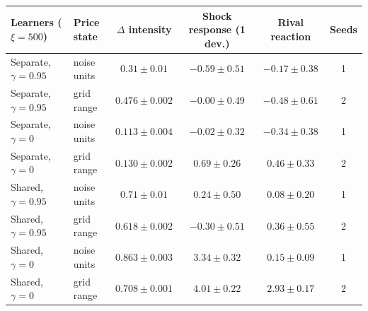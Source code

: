 \begin{tabular}{llcccc}
\toprule
Learners ($\xi=500$) & Price state & $\Delta$ intensity & Shock response (1 dev.) & Rival reaction & Seeds \\
\midrule
Separate, $\gamma=0.95$ & noise units & $0.31 \pm 0.01$ & $-0.59 \pm 0.51$ & $-0.17 \pm 0.38$ & 1 \\
Separate, $\gamma=0.95$ & grid range & $0.476 \pm 0.002$ & $-0.00 \pm 0.49$ & $-0.48 \pm 0.61$ & 2 \\
Separate, $\gamma=0$ & noise units & $0.113 \pm 0.004$ & $-0.02 \pm 0.32$ & $-0.34 \pm 0.38$ & 1 \\
Separate, $\gamma=0$ & grid range & $0.130 \pm 0.002$ & $0.69 \pm 0.26$ & $0.46 \pm 0.33$ & 2 \\
Shared, $\gamma=0.95$ & noise units & $0.71 \pm 0.01$ & $0.24 \pm 0.50$ & $0.08 \pm 0.20$ & 1 \\
Shared, $\gamma=0.95$ & grid range & $0.618 \pm 0.002$ & $-0.30 \pm 0.51$ & $0.36 \pm 0.55$ & 2 \\
Shared, $\gamma=0$ & noise units & $0.863 \pm 0.003$ & $3.34 \pm 0.32$ & $0.15 \pm 0.09$ & 1 \\
Shared, $\gamma=0$ & grid range & $0.708 \pm 0.001$ & $4.01 \pm 0.22$ & $2.93 \pm 0.17$ & 2 \\
\bottomrule
\end{tabular}